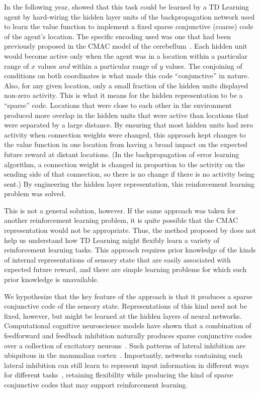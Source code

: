 \documentclass[preprint,12pt,authoryear]{elsarticle}
\begin{document}
In the following year, \cite{SuttonRS:1996:Coarse} showed that this
task could be learned by a TD Learning agent by hard-wiring the hidden
layer units of the backpropagation network used to learn the value
function to implement a fixed sparse conjunctive (coarse) code of the
agent's location. The specific encoding used was one that had been
previously proposed in the CMAC model of the
cerebellum~\cite{AlbusJS:1975:CMAC}. Each hidden unit would become
active only when the agent was in a location within a particular range
of $x$ values \emph{and} within a particular range of $y$ values. The
conjoining of conditions on both coordinates is what made this code
``conjunctive'' in nature. Also, for any given location, only a small
fraction of the hidden units displayed non-zero activity. This is what
it means for the hidden representation to be a ``sparse''
code. Locations that were close to each other in the environment
produced more overlap in the hidden units that were active than
locations that were separated by a large distance. By ensuring that
most hidden units had zero activity when connection weights were
changed, this approach kept changes to the value function in one
location from having a broad impact on the expected future reward at
distant locations. (In the backpropagation of error learning
algorithm, a connection weight is changed in proportion to the
activity on the sending side of that connection, so there is no change
if there is no activity being sent.) By engineering the hidden layer
representation, this reinforcement learning problem was solved.

This is not a general solution, however. If the same approach was
taken for another reinforcement learning problem, it is quite possible
that the CMAC representation would not be appropriate. Thus, the
method proposed by \cite{SuttonRS:1996:Coarse} does not help us
understand how TD Learning might flexibly learn a variety of
reinforcement learning tasks. This approach requires prior knowledge
of the kinds of internal representations of sensory state that are
easily associated with expected future reward, and there are simple
learning problems for which such prior knowledge is unavailable.

We hypothesize that the key feature of the
\citep{SuttonRS:1996:Coarse} approach is that it produces a sparse
conjunctive code of the sensory state. Representations of this kind
need not be fixed, however, but might be learned at the hidden layers
of neural networks. Computational cognitive neuroscience models have
shown that a combination of feedforward and feedback inhibition
naturally produces sparse conjunctive codes over a collection of
excitatory neurons~\citep{OReillyRC:2001:CECN}. Such patterns of
lateral inhibition are ubiquitous in the mammalian
cortex~\citep{KandelE:2012:Book}. Importantly, networks containing such
lateral inhibition can still learn to represent input information in
different ways for different tasks~\citep{OReillyRC:2001:CECN},
retaining flexibility while producing the kind of sparse conjunctive
codes that may support reinforcement learning.
\end{document}
